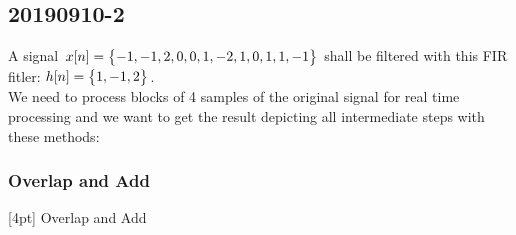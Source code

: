 




\pagebreak\subsection{20190910-2}
    A signal $x[n]=\begin{Bmatrix} {-1,-1,2,0,0,1,-2,1,0,1,1,-1} \end{Bmatrix}$ shall be filtered with this FIR fitler: $h[n]=\begin{Bmatrix} {1,-1,2} \end{Bmatrix}$.\\
    We need to process blocks of 4 samples of the original signal for real time processing and we want to get the result depicting all intermediate steps with these methods:

    \subsubsection{Overlap and Add}
    [4pt] Overlap and Add

